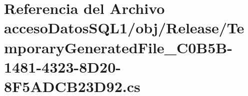 \hypertarget{acceso_datos_s_q_l1_2obj_2_release_2_temporary_generated_file__036_c0_b5_b-1481-4323-8_d20-8_f5_a_d_c_b23_d92_8cs}{}\section{Referencia del Archivo acceso\+Datos\+S\+Q\+L1/obj/\+Release/\+Temporary\+Generated\+File\+\_\+C0\+B5\+B-\/1481-\/4323-\/8\+D20-\/8\+F5\+A\+D\+C\+B23\+D92.cs}
\label{acceso_datos_s_q_l1_2obj_2_release_2_temporary_generated_file__036_c0_b5_b-1481-4323-8_d20-8_f5_a_d_c_b23_d92_8cs}
